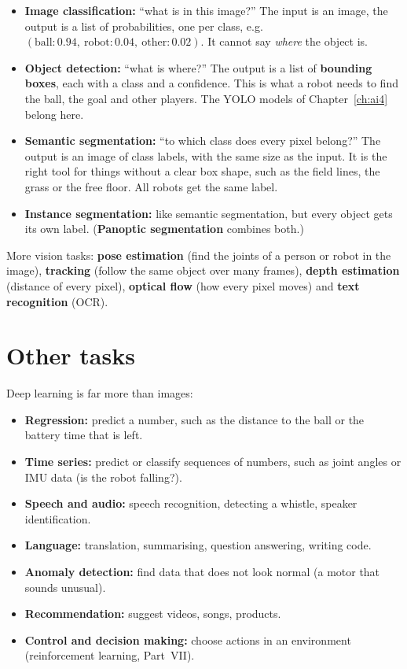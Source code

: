 \begin{itemize}[nosep]
  \item \textbf{Image classification:} ``what is in this image?'' The input is an image, the output is a list of probabilities, one per class, e.g.\ $(\text{ball}:0.94,\ \text{robot}:0.04,\ \text{other}:0.02)$. It cannot say \emph{where} the object is.
  \item \textbf{Object detection:} ``what is where?'' The output is a list of \textbf{bounding boxes}, each with a class and a confidence. This is what a robot needs to find the ball, the goal and other players. The YOLO models of Chapter~\ref{ch:ai4} belong here.
  \item \textbf{Semantic segmentation:} ``to which class does every pixel belong?'' The output is an image of class labels, with the same size as the input. It is the right tool for things without a clear box shape, such as the field lines, the grass or the free floor. All robots get the same label.
  \item \textbf{Instance segmentation:} like semantic segmentation, but every object gets its own label. (\textbf{Panoptic segmentation} combines both.)
\end{itemize}

More vision tasks: \textbf{pose estimation} (find the joints of a person or robot in the image), \textbf{tracking} (follow the same object over many frames), \textbf{depth estimation} (distance of every pixel), \textbf{optical flow} (how every pixel moves) and \textbf{text recognition} (OCR).

\section*{Other tasks}
Deep learning is far more than images:
\begin{itemize}[nosep]
  \item \textbf{Regression:} predict a number, such as the distance to the ball or the battery time that is left.
  \item \textbf{Time series:} predict or classify sequences of numbers, such as joint angles or IMU data (is the robot falling?).
  \item \textbf{Speech and audio:} speech recognition, detecting a whistle, speaker identification.
  \item \textbf{Language:} translation, summarising, question answering, writing code.
  \item \textbf{Anomaly detection:} find data that does not look normal (a motor that sounds unusual).
  \item \textbf{Recommendation:} suggest videos, songs, products.
  \item \textbf{Control and decision making:} choose actions in an environment (reinforcement learning, Part~VII).
\end{itemize}

